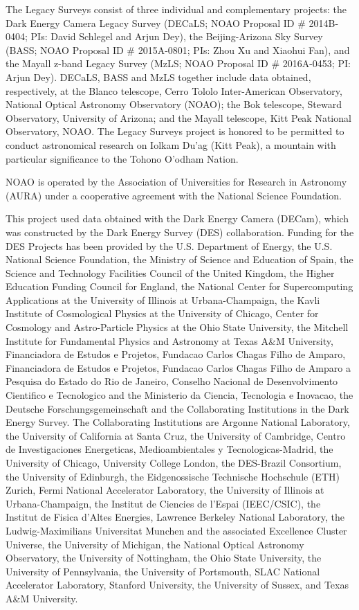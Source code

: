 \documentclass{raa}
\begin{document}
\begin{acknowledgements}
The Legacy Surveys consist of three individual and complementary projects: the Dark Energy Camera Legacy Survey (DECaLS; NOAO Proposal ID \# 2014B-0404; PIs: David Schlegel and Arjun Dey), the Beijing-Arizona Sky Survey (BASS; NOAO Proposal ID \# 2015A-0801; PIs: Zhou Xu and Xiaohui Fan), and the Mayall z-band Legacy Survey (MzLS; NOAO Proposal ID \# 2016A-0453; PI: Arjun Dey). DECaLS, BASS and MzLS together include data obtained, respectively, at the Blanco telescope, Cerro Tololo Inter-American Observatory, National Optical Astronomy Observatory (NOAO); the Bok telescope, Steward Observatory, University of Arizona; and the Mayall telescope, Kitt Peak National Observatory, NOAO. The Legacy Surveys project is honored to be permitted to conduct astronomical research on Iolkam Du'ag (Kitt Peak), a mountain with particular significance to the Tohono O'odham Nation.

NOAO is operated by the Association of Universities for Research in Astronomy (AURA) under a cooperative agreement with the National Science Foundation.

This project used data obtained with the Dark Energy Camera (DECam), which was constructed by the Dark Energy Survey (DES) collaboration. Funding for the DES Projects has been provided by the U.S. Department of Energy, the U.S. National Science Foundation, the Ministry of Science and Education of Spain, the Science and Technology Facilities Council of the United Kingdom, the Higher Education Funding Council for England, the National Center for Supercomputing Applications at the University of Illinois at Urbana-Champaign, the Kavli Institute of Cosmological Physics at the University of Chicago, Center for Cosmology and Astro-Particle Physics at the Ohio State University, the Mitchell Institute for Fundamental Physics and Astronomy at Texas A\&M University, Financiadora de Estudos e Projetos, Fundacao Carlos Chagas Filho de Amparo, Financiadora de Estudos e Projetos, Fundacao Carlos Chagas Filho de Amparo a Pesquisa do Estado do Rio de Janeiro, Conselho Nacional de Desenvolvimento Cientifico e Tecnologico and the Ministerio da Ciencia, Tecnologia e Inovacao, the Deutsche Forschungsgemeinschaft and the Collaborating Institutions in the Dark Energy Survey. The Collaborating Institutions are Argonne National Laboratory, the University of California at Santa Cruz, the University of Cambridge, Centro de Investigaciones Energeticas, Medioambientales y Tecnologicas-Madrid, the University of Chicago, University College London, the DES-Brazil Consortium, the University of Edinburgh, the Eidgenossische Technische Hochschule (ETH) Zurich, Fermi National Accelerator Laboratory, the University of Illinois at Urbana-Champaign, the Institut de Ciencies de l'Espai (IEEC/CSIC), the Institut de Fisica d'Altes Energies, Lawrence Berkeley National Laboratory, the Ludwig-Maximilians Universitat Munchen and the associated Excellence Cluster Universe, the University of Michigan, the National Optical Astronomy Observatory, the University of Nottingham, the Ohio State University, the University of Pennsylvania, the University of Portsmouth, SLAC National Accelerator Laboratory, Stanford University, the University of Sussex, and Texas A\&M University.


\end{acknowledgements}
\end{document}
